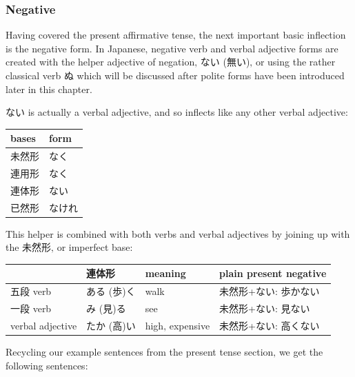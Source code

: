 \documentclass[11pt, b5paper, twoside, openright, onecolumn]{book}
\makeatletter
\newcommand*{\rtrubystack}[2]{{\relscale{0.5}%
  \begin{tabular}[b]{@{}c@{}}%
    {#1}\\%
    {\textscale{2}{#2}}%
  \end{tabular}}%
}
\DeclareRobustCommand*{\rtruby}[2]{%
  \mbox{%
    \setlength{\parskip}{0ex}%
    \BeginAccSupp{method=pdfstringdef,ActualText={#1}}%
      \rtrubystack{\phantom{#2}}{#1}%
      \llap{%
        \rtrubystack{#2}{\phantom{#1}}%
      }%
    \EndAccSupp{}%
  }%
}
\renewcommand*{\rtruby}[2]{#2 (#1)}%
\newenvironment{mytabular}[1]{\noindent\hspace{0.4in}
\begin{tabular}[h]{#1}}{\end{tabular}}
\makeatother
\begin{document}
\subsubsection{Negative}


Having covered the present affirmative tense‚ the next important basic inflection is the negative form. In Japanese‚ negative verb and verbal adjective forms are created with the helper adjective of negation‚ ない (無い)‚ or using the rather classical verb ぬ which will be discussed after polite forms have been introduced later in this chapter.

ない is actually a verbal adjective‚ and so inflects like any other verbal adjective:

\vspace{0.5cm}
\smaller
\begin{mytabular}{| l  l |}\hline 
\rule{0pt}{2.4ex}bases & form\\ 
\hline
\rule{0pt}{2.4ex}未然形 & なく\\ 
\rule{0pt}{2.4ex}連用形 & なく\\ 
\rule{0pt}{2.4ex}連体形 & ない\\ 
\rule{0pt}{2.4ex}已然形 & なけれ\\ 
\hline 
\end{mytabular}
\larger
\vspace{0.5cm}


This helper is combined with both verbs and verbal adjectives by joining up with the 未然形‚ or imperfect base:

\vspace{0.5cm}
\smaller
\begin{mytabular}{| l  l  l  l |}\hline 
\rule{0pt}{2.4ex} & 連体形 & meaning & plain present negative\\ 
\hline
\rule{0pt}{3.6ex}五段 verb & \rtruby{歩}{ある}く & walk & 未然形+ない: 歩かない\\ 
\rule{0pt}{3.6ex}一段 verb & \rtruby{見}{み}る & see & 未然形+ない: 見ない\\ 
\rule{0pt}{3.6ex}verbal adjective & \rtruby{高}{たか}い & high‚ expensive & 未然形+ない: 高くない\\ 
\hline 
\end{mytabular}
\larger
\vspace{0.5cm}


Recycling our example sentences from the present tense section‚ we get the following sentences:
\end{document}
